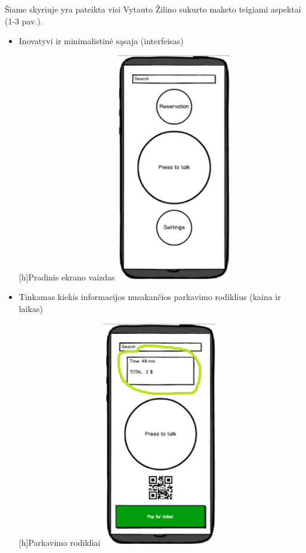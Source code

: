 \documentclass{VUMIFPSkursinis}
\begin{document}
Šiame skyriuje yra pateikta visi Vytauto Žilino sukurto maketo teigiami aspektai (1-3 pav.).
\vspace{5mm}

\begin{itemize}
\item Inovatyvi ir minimalistinė sąsaja (interfeisas)\par
\begin{minipage}{\linewidth}
[h]{Pradinis ekrano vaizdas}
\centering
\includegraphics[width=5cm]{img/Good1}
\end{minipage}
\item Tinkamas kiekis informacijos nusakančios parkavimo rodiklius (kaina ir laikas)\par
\begin{minipage}{\linewidth}
[h]{Parkavimo rodikliai}
\centering
\includegraphics[width=5cm]{img/Good2}

\end{minipage}
\end{itemize}
\end{document}
